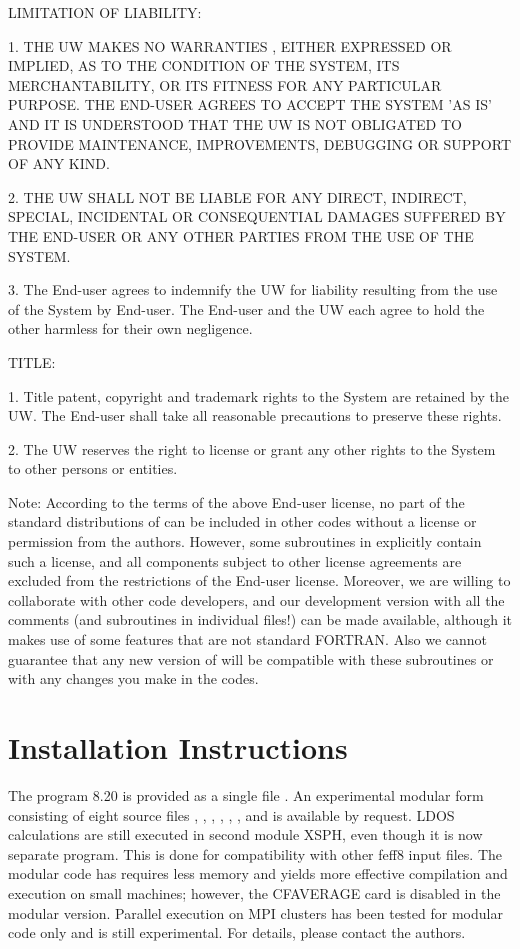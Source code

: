 \documentclass[11pt,oneside]{report} %
\begin{document}
 LIMITATION OF LIABILITY:

 1.   THE UW MAKES NO WARRANTIES , EITHER EXPRESSED OR IMPLIED, AS TO
 THE CONDITION OF THE SYSTEM, ITS MERCHANTABILITY, OR ITS FITNESS FOR
 ANY PARTICULAR PURPOSE.  THE END-USER AGREES TO ACCEPT THE SYSTEM
 'AS IS' AND IT IS UNDERSTOOD THAT THE UW IS NOT OBLIGATED TO PROVIDE
 MAINTENANCE, IMPROVEMENTS, DEBUGGING OR SUPPORT OF ANY KIND.

 2. THE UW SHALL NOT BE LIABLE FOR ANY DIRECT, INDIRECT, SPECIAL,
 INCIDENTAL OR CONSEQUENTIAL DAMAGES SUFFERED BY THE END-USER OR ANY
 OTHER PARTIES FROM THE USE OF THE SYSTEM.

 3.  The End-user agrees to indemnify the UW for liability resulting
 from the use of the System by End-user. The End-user and the UW each
 agree to hold the other harmless for their own negligence.

 TITLE:

 1.  Title patent, copyright and trademark rights to the System are
 retained by the UW. The End-user shall take all reasonable precautions
 to preserve these rights.

 2.  The UW reserves the right to license or grant any other rights to
 the System to other persons or entities.


Note: According to the terms of the above End-user license, 
no part of the standard distributions of {\feff} can be included in other
codes without a license or permission from the authors. However, some subroutines
in {\feff} explicitly contain such a license, and all components subject to
other license agreements are excluded from the restrictions of the
End-user license. Moreover, we are willing to collaborate with other code
developers, and our development version with all the
comments (and subroutines in individual files!) can be made available,
although it makes use of some features that are not standard FORTRAN.
Also we cannot guarantee that any new version of {\feff} will be compatible 
with these subroutines or with any changes you make in the codes.

\chapter{Installation Instructions}
\label{sec:Append-B.-Inst}

The program {\feff}8.20 is provided as a single file .
An experimental modular form consisting of eight source files 
, , , ,
, ,  and 
 is available by request.
LDOS calculations are still executed in second module XSPH, even though
it is now separate program. This is done for compatibility with other
feff8 input files. The modular code has  requires less memory
and yields more effective compilation and execution on small machines;
however, the CFAVERAGE card is disabled in the modular version.
Parallel execution on MPI clusters has been tested for modular code only
and is still experimental. For details, please contact the authors.
\end{document}
